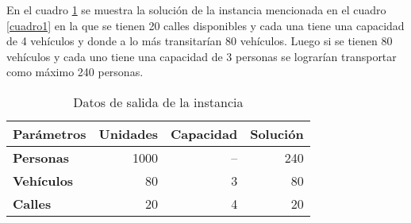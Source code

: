 \documentclass{article}
\begin{document}
\vspace{.3cm}
 \label{c2}
 
\vspace{.6cm}

En el cuadro \ref{cuadro2} se muestra la solución de la instancia mencionada en el cuadro \ref{cuadro1} en la que se tienen 20 calles disponibles y cada una tiene una capacidad de 4 vehículos y donde a lo más transitarían 80 vehículos. Luego si se tienen 80 vehículos y cada uno tiene una capacidad de 3 personas se lograrían transportar como máximo 240 personas. 

\begin{table}[H]
\centering
\caption{Datos de salida de la instancia}
\begin{tabular}{|l|r|r|r|}
\hline
\textbf{Parámetros} & \multicolumn{1}{l|}{\textbf{Unidades}} & \multicolumn{1}{l|}{\textbf{Capacidad}} & \multicolumn{1}{l|}{\textbf{Solución}} \\ \hline
\textbf{Personas}   & 1000                                   & --                                      & 240                                    \\ \hline
\textbf{Vehículos}  & 80                                     & 3                                       & 80                                     \\ \hline
\textbf{Calles}     & 20                                     & 4                                       & 20                                     \\ \hline
\end{tabular}
\label{cuadro2}
\end{table}




\end{document}
